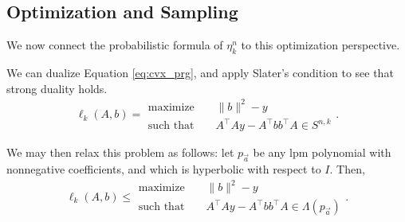 \documentclass{amsart}
\theoremstyle{definition}
\numberwithin{equation}{section}
\begin{document}
\subsection{Optimization and Sampling}
We now connect the probabilistic formula of $\eta_k^n$ to this optimization perspective.

We can dualize Equation \ref{eq:cvx_prg}, and apply Slater's condition to see that strong duality holds.
\begin{equation}\label{eq:cvx_dual}
    \ell_{k}(A, b) =
\begin{aligned}
    \text{maximize} &&\|b\|^2 - y\\
    \text{such that } && A^{\intercal}Ay - A^{\intercal}bb^{\intercal}A \in S^{n,k}
\end{aligned}.
\end{equation}

We may then relax this problem as follows: let $p_{\vec{a}}$ be any lpm polynomial with nonnegative coefficients, and which is hyperbolic with respect to $I$. Then,
\begin{equation}\label{eq:cvx_relax}
    \ell_{k}(A, b) \le
\begin{aligned}
    \text{maximize} &&\|b\|^2 - y\\
    \text{such that } && A^{\intercal}Ay - A^{\intercal}bb^{\intercal}A \in \Lambda(p_{\vec{a}})
\end{aligned}.
\end{equation}
\end{document}
